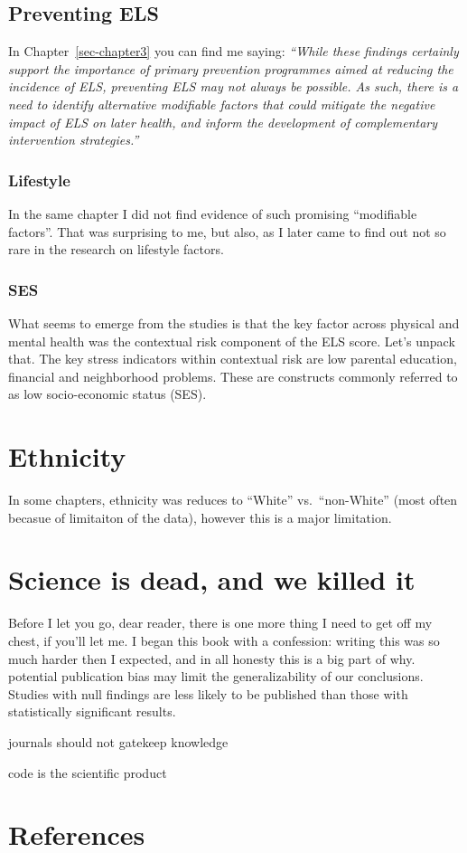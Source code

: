 \documentclass[
  letterpaper,
  DIV=11,
  numbers=noendperiod]{scrreport}
\begin{document}
\subsection{Preventing ELS}\label{preventing-els}

In Chapter~\ref{sec-chapter3} you can find me saying: \emph{``While
these findings certainly support the importance of primary prevention
programmes aimed at reducing the incidence of ELS, preventing ELS may
not always be possible. As such, there is a need to identify alternative
modifiable factors that could mitigate the negative impact of ELS on
later health, and inform the development of complementary intervention
strategies.''}

\subsubsection{Lifestyle}\label{lifestyle}

In the same chapter I did not find evidence of such promising
``modifiable factors''. That was surprising to me, but also, as I later
came to find out not so rare in the research on lifestyle factors.

\subsubsection{SES}\label{ses}

What seems to emerge from the studies is that the key factor across
physical and mental health was the contextual risk component of the ELS
score. Let's unpack that. The key stress indicators within contextual
risk are low parental education, financial and neighborhood problems.
These are constructs commonly referred to as low socio-economic status
(SES).

\section{Ethnicity}\label{ethnicity}

In some chapters, ethnicity was reduces to ``White'' vs.~``non-White''
(most often becasue of limitaiton of the data), however this is a major
limitation.

\section{Science is dead, and we killed
it}\label{science-is-dead-and-we-killed-it}

Before I let you go, dear reader, there is one more thing I need to get
off my chest, if you'll let me. I began this book with a confession:
writing this was so much harder then I expected, and in all honesty this
is a big part of why. potential publication bias may limit the
generalizability of our conclusions. Studies with null findings are less
likely to be published than those with statistically significant
results.

journals should not gatekeep knowledge

code is the scientific product

\section*{References}\label{references-7}

\end{document}
